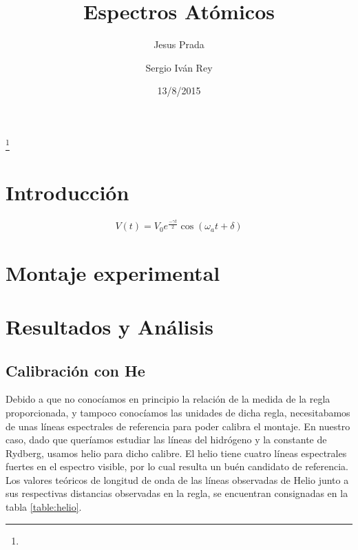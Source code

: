 \documentclass[%
 reprint,
 amsmath,amssymb,
 aps,
]{revtex4-1}
\begin{document}

\title{Espectros Atómicos}%
\thanks{}%

\author{Jesus Prada}
\author{Sergio Iv\'an Rey}%
%

\date{13/8/2015}%

\begin{abstract}

\end{abstract}


\keywords{}%
\maketitle


\section{\label{sec:level1}Introducci\'on}

\begin{equation}
V(t) = V_0 e^{\frac{-\gamma t}{2}}\cos(\omega_a t + \delta)
\label{eq:amortiguado}
\end{equation}

\section{\label{sec:level1}Montaje experimental}

\section{\label{sec:level1}Resultados y An\'alisis}
\subsection{\label{sec:level2}Calibración con He}
Debido a que no conocíamos en principio la relación de la medida de la regla proporcionada, y tampoco conocíamos las unidades de dicha regla, necesitabamos de unas líneas espectrales de referencia para poder calibra el montaje. En nuestro caso, dado que queríamos estudiar las líneas del hidrógeno y la constante de Rydberg, usamos helio para dicho calibre. El helio tiene cuatro líneas espectrales fuertes en el espectro visible, por lo cual resulta un buén candidato de referencia. Los valores teóricos de longitud de onda de las líneas observadas de Helio junto a sus respectivas distancias observadas en la regla, se encuentran consignadas en la tabla \ref{table:helio}.\\
\end{document}
